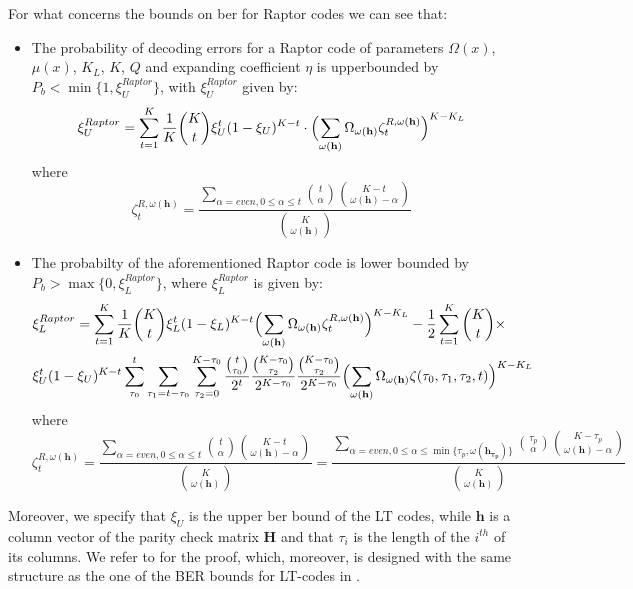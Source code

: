For what concerns the bounds on \gls{ber} for Raptor codes we can see that:
\begin{itemize}
  \item The probability of decoding errors for a Raptor code of parameters $\Omega(x)$, $\mu(x)$, $K_L$, $K$, $Q$ and expanding coefficient $\eta$ is upperbounded by $P_b < \min\{1,\xi_U^{Raptor}\}$, with $\xi_U^{Raptor}$ given by:
  \begin{equation}
    \xi_U^{Raptor} = \sum_{t=1}^K\frac{1}{K}\binom{K}{t}\xi_U^t(1-\xi_U)^{K-t}\cdot\Bigl(\sum_{\omega(\mathbf{h})}\Omega_{\omega(\mathbf{h})}\zeta_t^{R,\omega(\mathbf{h})}\Bigr)^{K-K_L}
  \end{equation}
  where
  \begin{equation}
    \zeta_t^{R,\omega(\mathbf{h})} = \frac{\sum_{\alpha = even,0\leq\alpha\leq t}\binom{t}{\alpha}\binom{K-t}{\omega(\mathbf{h})-\alpha}}{\binom{K}{\omega(\mathbf{h})}}
  \end{equation}
  \item The probabilty of the aforementioned Raptor code is lower bounded by $P_b > \max\{0,\xi_L^{Raptor}\}$, where $\xi_L^{Raptor}$ is given by:
  \begin{align}
    &\xi_L^{Raptor} = \sum_{t=1}^K\frac{1}{K}\binom{K}{t}\xi_L^t(1-\xi_L)^{K-t}\Bigl(\sum_{\omega(\mathbf{h})}\Omega_{\omega(\mathbf{h})}\zeta_t^{R,\omega(\mathbf{h})}\Bigr)^{K-K_L}-\frac{1}{2}\sum_{t=1}^K\binom{K}{t}\times\\
    &\xi_U^t(1-\xi_U)^{K-t}\sum_{\tau_0}^t\sum_{\tau_1 = t-\tau_0}\sum_{\tau_2=0}^{K-\tau_0}\frac{\binom{t}{\tau_0}}{2^t}\frac{\binom{K-\tau_0}{\tau_2}}{2^{K-\tau_0}}\frac{\binom{K-\tau_0}{\tau_2}}{2^{K-\tau_0}}\Bigl(\sum_{\omega(\mathbf{h})}\Omega_{\omega(\mathbf{h})}\zeta(\tau_0,\tau_1,\tau_2,t)\Bigr)^{K-K_L}
  \end{align}
  where
  \begin{equation}
    \zeta_t^{R,\omega(\mathbf{h})} = \frac{\sum\limits_{\alpha = even,0\leq\alpha\leq t}\binom{t}{\alpha}\binom{K-t}{\omega(\mathbf{h})-\alpha}}{\binom{K}{\omega(\mathbf{h})}} = \frac{\sum\limits_{\alpha=even,0\leq\alpha\leq \min\{\tau_p,\omega(\mathbf{h_{\tau_p}})\}}\binom{\tau_p}{\alpha}\binom{K-\tau_p}{\omega(\mathbf{h})-\alpha}}{\binom{K}{\omega(\mathbf{h})}}
  \end{equation}
\end{itemize}
Moreover, we specify that $\xi_U$ is the upper \gls{ber} bound of the LT codes, while $\mathbf{h}$ is a column vector of the parity check matrix $\mathbf{H}$ and that $\tau_i$ is the length of the $i^{th}$ of its columns. We refer to \cite{Yue2013} for the proof, which, moreover, is designed with the same structure as the one of the BER bounds for LT-codes in \cite{Yue2014}.
